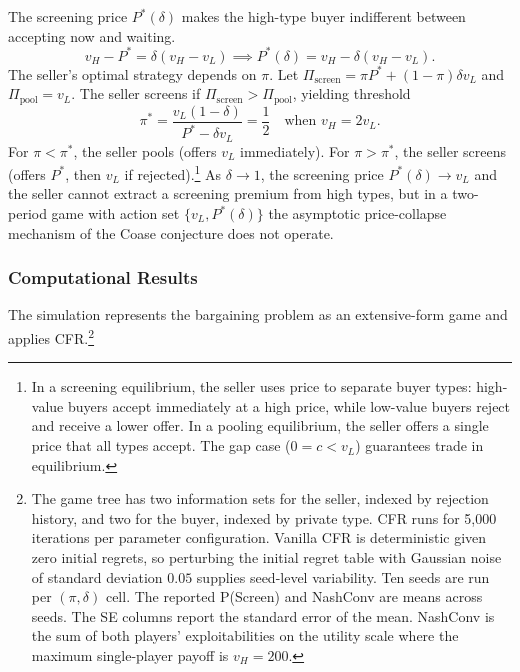 The screening price $P^*(\delta)$ makes the high-type buyer indifferent between accepting now and waiting.
\begin{equation}
v_H - P^* = \delta(v_H - v_L) \implies P^*(\delta) = v_H - \delta(v_H - v_L).
\end{equation}
The seller's optimal strategy depends on $\pi$. Let $\Pi_{\text{screen}} = \pi P^* + (1-\pi)\delta v_L$ and $\Pi_{\text{pool}} = v_L$. The seller screens if $\Pi_{\text{screen}} > \Pi_{\text{pool}}$, yielding threshold
\begin{equation}
\pi^* = \frac{v_L(1-\delta)}{P^* - \delta v_L} = \frac{1}{2} \quad \text{when } v_H = 2v_L.
\end{equation}
For $\pi < \pi^*$, the seller pools (offers $v_L$ immediately). For $\pi > \pi^*$, the seller screens (offers $P^*$, then $v_L$ if rejected).\footnote{In a screening equilibrium, the seller uses price to separate buyer types: high-value buyers accept immediately at a high price, while low-value buyers reject and receive a lower offer. In a pooling equilibrium, the seller offers a single price that all types accept. The gap case ($0 = c < v_L$) guarantees trade in equilibrium.} As $\delta \to 1$, the screening price $P^*(\delta) \to v_L$ and the seller cannot extract a screening premium from high types, but in a two-period game with action set $\{v_L, P^*(\delta)\}$ the asymptotic price-collapse mechanism of the Coase conjecture does not operate.

\subsubsection{Computational Results}

The simulation represents the bargaining problem as an extensive-form
game and applies CFR.\footnote{The game tree has two information sets
for the seller, indexed by rejection history, and two for the buyer,
indexed by private type. CFR runs for 5{,}000 iterations per parameter
configuration. Vanilla CFR is deterministic given zero initial
regrets, so perturbing the initial regret table with Gaussian noise of
standard deviation $0.05$ supplies seed-level variability. Ten seeds
are run per $(\pi, \delta)$ cell. The reported P(Screen) and NashConv
are means across seeds. The SE columns report the standard error of the
mean. NashConv is the sum of both players' exploitabilities on the
utility scale where the maximum single-player payoff is $v_H = 200$.}

